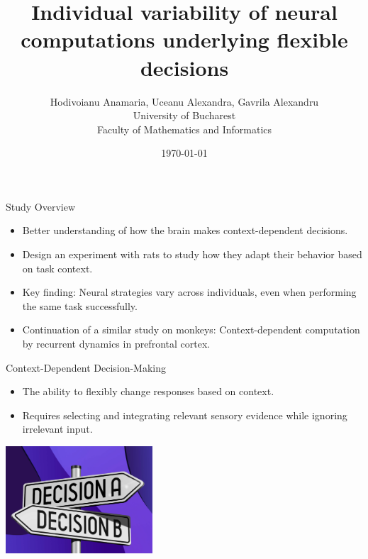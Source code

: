 \documentclass{beamer}
\title{Individual variability of neural computations underlying flexible decisions}
\author{Hodivoianu Anamaria, Uceanu Alexandra, Gavrila Alexandru\\ University of Bucharest\\ Faculty of Mathematics and Informatics}
\date{\today}
\begin{document}
\begin{frame}
    \titlepage
\end{frame}

\begin{frame}{Study Overview}
    \begin{itemize}
        \item Better understanding of how the brain makes context-dependent decisions.
        \item Design an experiment with rats to study how they adapt their behavior based on task context.
        \item Key finding: Neural strategies vary across individuals, even when performing the same task successfully.
        \item Continuation of a similar study on monkeys: Context-dependent computation by recurrent dynamics in prefrontal cortex.
    \end{itemize}
\end{frame}

\begin{frame}{Context-Dependent Decision-Making}
    \begin{itemize}
        \item The ability to flexibly change responses based on context.
        \item Requires selecting and integrating relevant sensory evidence while ignoring irrelevant input.
    \end{itemize}
    \begin{minipage}{1\textwidth}
        \centering
        \includegraphics[height=4cm]{decisions.jpg}
    \end{minipage}
\end{frame}
\end{document}
